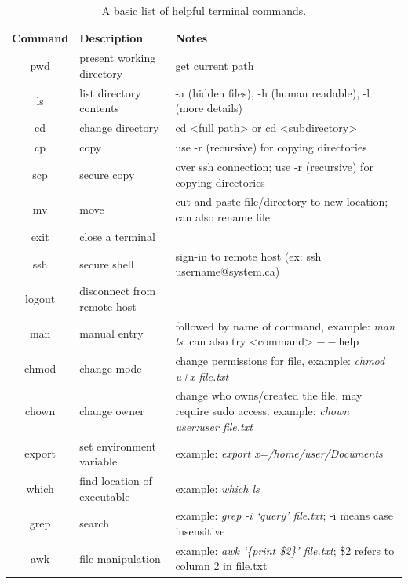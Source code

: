 \documentclass[12pt]{article}
\begin{document}
\begin{table}[H]
\begin{changemargin}{-1.5cm}{-1.5cm}
\centering
\caption{A basic list of helpful terminal commands.}
{\renewcommand{\arraystretch}{1.4}%
\begin{tabular}{|c|C{4.5cm}|C{9.5cm}|}
\hline
\textbf{Command} & \textbf{Description} & \textbf{Notes} \\
\hline
pwd & present working directory & get current path \\
ls & list directory contents & -a (hidden files), -h (human readable), -l (more details) \\
cd & change directory & cd <full path> or cd <subdirectory> \\
cp & copy & use -r (recursive) for copying directories \\
scp & secure copy & over ssh connection; use -r (recursive) for copying directories\\
mv & move & cut and paste file/directory to new location; can also rename file\\
exit & close a terminal & \\
ssh & secure shell & sign-in to remote host (ex: ssh username@system.ca) \\
logout & disconnect from remote host & \\
man & manual entry & followed by name of command, example: \textit{man ls}. can also try <command> $--$help \\
chmod & change mode & change permissions for file, example: \textit{chmod u+x file.txt} \\
chown & change owner & change who owns/created the file, may require sudo access. example: \textit{chown user:user file.txt} \\
export & set environment variable & example: \textit{export x=/home/user/Documents} \\
which & find location of executable & example: \textit{which ls} \\
grep & search & example: \textit{grep -i `query' file.txt}; -i means case insensitive \\
awk & file manipulation & example: \textit{awk `\{print \$2\}' file.txt}; \$2 refers to column 2 in file.txt \\


\hline
\end{tabular}
}
\label{big-table}
\end{changemargin}
\end{table}
\newpage
\end{document}
